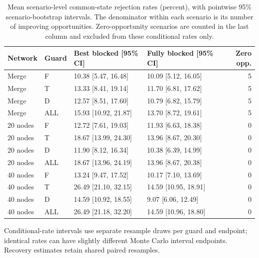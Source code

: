 \begin{table}[!htbp]
\caption{Mean scenario-level common-state rejection rates (percent), with pointwise 95\% scenario-bootstrap intervals. The denominator within each scenario is its number of improving opportunities. Zero-opportunity scenarios are counted in the last column and excluded from these conditional rates only.}\label{tab:service-split-rates}
\centering\small
\begin{tabularx}{\textwidth}{l l L L r}
\toprule Network & Guard & Best blocked [95\% CI] & Fully blocked [95\% CI] & Zero opp.\\\midrule
Merge & F & 10.38 [5.47, 16.48] & 10.09 [5.12, 16.05] & 5\\
Merge & T & 13.33 [8.41, 19.14] & 11.70 [6.81, 17.62] & 5\\
Merge & D & 12.57 [8.51, 17.60] & 10.79 [6.82, 15.79] & 5\\
Merge & ALL & 15.93 [10.92, 21.87] & 13.70 [8.72, 19.61] & 5\\
20 nodes & F & 12.72 [7.61, 19.03] & 11.93 [6.63, 18.38] & 0\\
20 nodes & T & 18.67 [13.99, 24.30] & 13.96 [8.67, 20.30] & 0\\
20 nodes & D & 11.90 [8.12, 16.34] & 10.38 [6.39, 14.99] & 0\\
20 nodes & ALL & 18.67 [13.96, 24.19] & 13.96 [8.67, 20.38] & 0\\
40 nodes & F & 13.24 [9.47, 17.52] & 10.17 [7.10, 13.69] & 0\\
40 nodes & T & 26.49 [21.10, 32.15] & 14.59 [10.95, 18.91] & 0\\
40 nodes & D & 14.59 [10.92, 18.55] & 9.07 [6.06, 12.49] & 0\\
40 nodes & ALL & 26.49 [21.18, 32.20] & 14.59 [10.96, 18.80] & 0\\
\bottomrule
\end{tabularx}
\par\smallskip\footnotesize Conditional-rate intervals use separate resample draws per guard and endpoint; identical rates can have slightly different Monte Carlo interval endpoints. Recovery estimates retain shared paired resamples.
\end{table}
